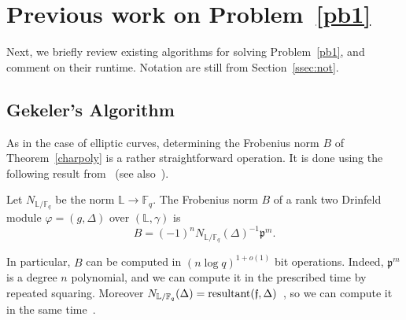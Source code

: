 \documentclass[sigconf]{acmart}
\newcommand{\F}{\mathbb{F}}
\renewcommand{\L}{\mathbb{L}}
\newcommand{\frakf}{\mathfrak{f}}
\newcommand{\frakp}{\mathfrak{p}}
\begin{document}

\section{Previous work on Problem~\ref{pb1}}\label{sec:prev}

Next, we briefly review existing algorithms for solving
Problem~\ref{pb1}, and comment on their runtime. Notation are still
from Section~\ref{ssec:not}.


\subsection{Gekeler's Algorithm}\label{ssec:gek}

As in the case of elliptic curves, determining the Frobenius norm $B$
of Theorem~\ref{charpoly} is a rather straightforward operation. It is
done using the following result from~\cite[Th.~2.11]{frobdist} (see
also~\cite{HsYu00}).

\begin{proposition}\label{frobnorm}
Let $N_{\L/\F_q}$ be the norm $\L \to \F_q$. The Frobenius norm $B$ of a rank two Drinfeld module $\varphi=(g,\Delta)$ 
  over $(\L,\gamma)$ is
  \[B = (-1)^n N_{\L/\F_q}(\Delta)^{-1}\frakp^m.\]
\end{proposition}
In particular, $B$ can be computed in $(n \log q)^{1+o(1)}$ bit
operations. Indeed, $\frakp^m$ is a degree $n$ polynomial, and we can
compute it in the prescribed time by repeated squaring. Moreover
$N_{\L/\F_q}(\Delta) =
\textnormal{resultant}(\frakf,\Delta)$~\cite{Pohst:1989:AAN:76692},
so we can compute it in the same time~\cite{Gathen:2003:MCA:945759}.
\end{document}
